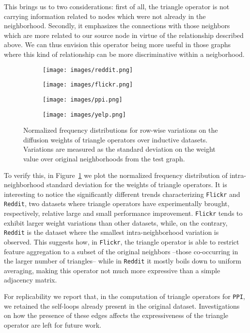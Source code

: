 \documentclass{article}
\begin{document}
This brings us to two considerations: first of all, the triangle operator is not carrying information related to nodes which were not already in the neighborhood. Secondly, it emphasizes the connections with those neighbors which are more related to our source node in virtue of the relationship described above. We can thus envision this operator being more useful in those graphs where this kind of relationship can be more discriminative within a neigborhood.

\begin{figure}
    \begin{subfigure}[t]{0.465\linewidth}
    \centering
    \texttt{[image: images/reddit.png]}
    \end{subfigure}\hfill \begin{subfigure}[t]{0.465\linewidth}
    \centering
    \texttt{[image: images/flickr.png]}
    \end{subfigure}\hfill \begin{subfigure}[t]{0.465\linewidth}
    \centering
    \texttt{[image: images/ppi.png]}
    \end{subfigure}\hfill \begin{subfigure}[t]{0.465\linewidth}
    \centering
    \texttt{[image: images/yelp.png]}
    \end{subfigure}
    \caption{Normalized frequency distributions for row-wise variations on the diffusion weights of triangle operators over inductive datasets. Variations are measured as the standard deviation on the weight value over original neighborhoods from the test graph.}
    \label{fig:triangles}
\end{figure}

To verify this, in Figure~\ref{fig:triangles} we plot the normalized frequency distribution of intra-neighborhood standard deviation for the weights of triangle operators. It is interesting to notice the significantly different trends characterizing \texttt{Flickr} and \texttt{Reddit}, two datasets where triangle operators have experimentally brought, respectively, relative large and small performance improvement. \texttt{Flickr} tends to exhibit larger weight variations than other datasets, while, on the contrary, \texttt{Reddit} is the dataset where the smallest intra-neighborhood variation is observed. This suggests how, in \texttt{Flickr}, the triangle operator is able to restrict feature aggregation to a subset of the original neighbors --those co-occurring in the larger number of triangles-- while in \texttt{Reddit} it mostly boils down to uniform averaging, making this operator not much more expressive than a simple adjacency matrix.

For replicability we report that, in the computation of triangle operators for \texttt{PPI}, we retained the self-loops already present in the original dataset. Investigations on how the presence of these edges affects the expressiveness of the triangle operator are left for future work. 
\end{document}
